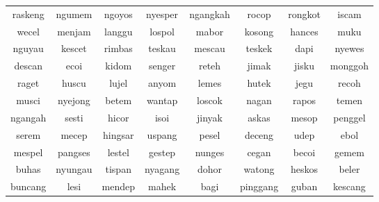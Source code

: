 \documentclass{article}
\begin{document}
\begin{center}
\begin{tabular}{c c c c c c c c}
	\toprule
	raskeng & ngumem  & ngoyos  & nyesper & ngangkah & rocop    & rongkot & iscam   \\
	 wecel  & menjam  & langgu  & lospol  & mabor    & kosong   & hances  & muku    \\
	nguyau  & kescet  & rimbas  & teskau  & mescau   & teskek   & dapi    & nyewes  \\
	descan  & ecoi    & kidom   & senger  & reteh    & jimak    & jisku   & monggoh \\
	 raget  & huscu   & lujel   & anyom   & lemes    & hutek    & jegu    & recoh   \\
	 musci  & nyejong & betem   & wantap  & loscok   & nagan    & rapos   & temen   \\
	ngangah & sesti   & hicor   & isoi    & jinyak   & askas    & mesop   & penggel \\
	 serem  & mecep   & hingsar & uspang  & pesel    & deceng   & udep    & ebol    \\
	mespel  & pangses & lestel  & gestep  & nunges   & cegan    & becoi   & gemem   \\
	 buhas  & nyungau & tispan  & nyagang & dohor    & watong   & heskos  & beler   \\
	buncang & lesi    & mendep  & mahek   & bagi     & pinggang & guban   & kescang \\ \bottomrule
\end{tabular}
\end{center}
\end{document}

